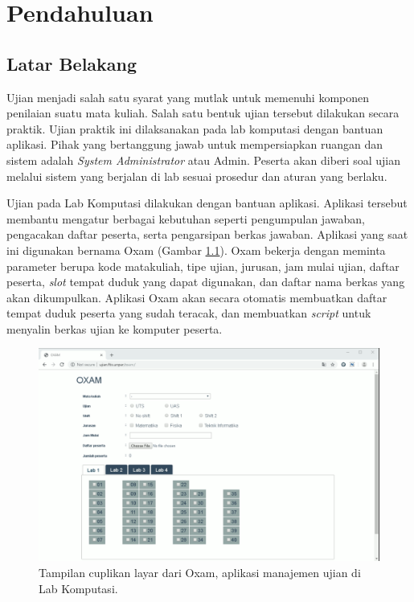 \chapter{Pendahuluan}
\label{chap:intro}
   
\section{Latar Belakang}
\label{sec:label}
Ujian menjadi salah satu syarat yang mutlak untuk memenuhi komponen penilaian
suatu mata kuliah. Salah satu bentuk ujian tersebut dilakukan secara praktik.
Ujian praktik ini dilaksanakan pada lab komputasi dengan bantuan aplikasi. Pihak
yang bertanggung jawab untuk mempersiapkan ruangan dan sistem adalah
\textit{System Administrator} atau Admin. Peserta akan diberi soal ujian melalui
sistem yang berjalan di lab sesuai prosedur dan aturan yang berlaku.

Ujian pada Lab Komputasi dilakukan dengan bantuan aplikasi. Aplikasi tersebut
membantu mengatur berbagai kebutuhan seperti pengumpulan jawaban, pengacakan
daftar peserta, serta pengarsipan berkas jawaban. Aplikasi yang saat ini
digunakan bernama Oxam (Gambar \ref{fig:ss-Oxam}). Oxam bekerja dengan meminta
parameter berupa kode matakuliah, tipe ujian, jurusan, jam mulai ujian, daftar
peserta, \textit{slot} tempat duduk yang dapat digunakan, dan daftar nama berkas
yang akan dikumpulkan. Aplikasi Oxam akan secara otomatis membuatkan daftar
tempat duduk peserta yang sudah teracak, dan membuatkan \textit{script} untuk
menyalin berkas ujian ke komputer peserta.

\begin{figure}
    \centering
    \includegraphics[width=0.7\paperwidth]{Gambar/ss-oxam.png}
    \caption{Tampilan cuplikan layar dari Oxam, aplikasi manajemen ujian di Lab Komputasi.}
    \label{fig:ss-Oxam}
\end{figure}

